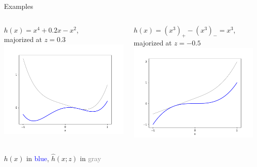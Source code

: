 \documentclass[aspectratio=169,11pt]{beamer}
\begin{document}
\begin{frame}{Examples}
\begin{columns}
\begin{column}{0.5\textwidth}
\centering
$h(x) = x^4 + 0.2 x - x^2$, \\ majorized at $z=0.3$ \\
\includegraphics[width=\textwidth]{DC1_majorized.pdf}
\end{column}
\begin{column}{0.5\textwidth}
\centering
$h(x) = (x^3)_+ - (x^3)_- = x^3$, \\ majorized at $z=-0.5$ \\
\includegraphics[width=\textwidth]{DC2_majorized.pdf}
\end{column}
\end{columns}
\vfill\centering
$h(x)$ in \textcolor{blue}{blue},
$\hat h(x; z)$ in \textcolor{gray}{gray}
\end{frame}
\end{document}
